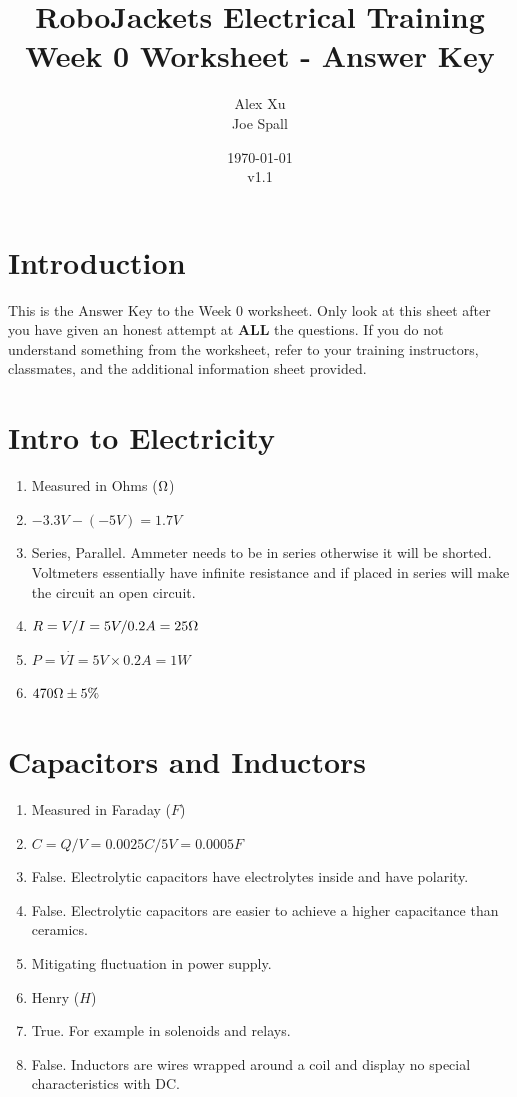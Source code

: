 \documentclass{article}
\title{RoboJackets Electrical Training Week 0 Worksheet - Answer Key}
\author{Alex Xu \\ Joe Spall}
\date{\today\\v1.1}
\begin{document}
\maketitle{}
\setcounter{tocdepth}{2}
\tableofcontents


\pagebreak

\section{Introduction}
This is the Answer Key to the Week 0 worksheet. Only look at this sheet after you have given an honest attempt at \textbf{ALL} the questions. If you do not understand something from the worksheet, refer to your training instructors, classmates, and the additional information sheet provided.

\section{Intro to Electricity}
\begin{enumerate}
	\item Measured in Ohms ($\ohm$)
	\item $-3.3V-(-5V)=1.7V$
	\item Series, Parallel. Ammeter needs to be in series otherwise it will be shorted. Voltmeters essentially have infinite resistance and if placed in series will make the circuit an open circuit.
	\item $R=V/I=5V/0.2A=25\ohm$
	\item $P=V\dot I = 5V \times 0.2 A = 1W$
	\item $470\ohm \pm 5\%$
\end{enumerate}

\section{Capacitors and Inductors}
\begin{enumerate}
	\item Measured in Faraday ($F$)
	\item $C=Q/V=0.0025C/5V=0.0005F$
	\item False. Electrolytic capacitors have electrolytes inside and have polarity.
	\item False. Electrolytic capacitors are easier to achieve a higher capacitance than ceramics.
	\item Mitigating fluctuation in power supply.
	\item Henry ($H$)
	\item True. For example in solenoids and relays.
	\item False. Inductors are wires wrapped around a coil and display no special characteristics with DC.
\end{enumerate}
\end{document}
